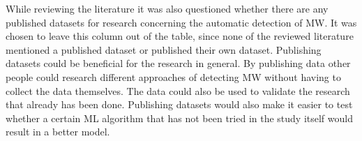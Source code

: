 While reviewing the literature it was also questioned whether there are any published datasets for research concerning the automatic detection of MW. It was chosen to leave this column out of the table, since none of the reviewed literature mentioned a published dataset or published their own dataset. Publishing datasets could be beneficial for the research in general. By publishing data other people could research different approaches of detecting MW without having to collect the data themselves. The data could also be used to validate the research that already has been done. Publishing datasets would also make it easier to test whether a certain ML algorithm that has not been tried in the study itself would result in a better model.